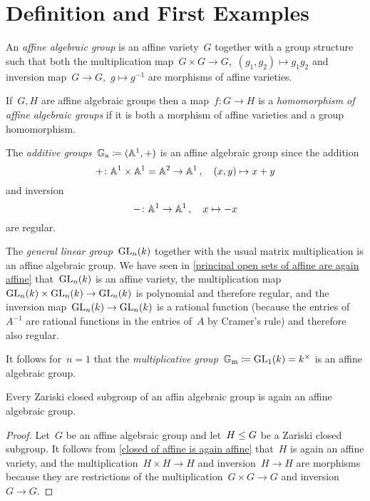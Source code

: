 \section{Definition and First Examples}


\begin{definition}
  An \emph{affine algebraic group} is an affine variety~$G$ together with a group structure such that both the multiplication map~$G \times G \to G$,~$(g_1, g_2) \mapsto g_1 g_2$ and inversion map~$G \to G$,~$g \mapsto g^{-1}$ are morphisms of affine varieties.
  
  If~$G, H$ are affine algebraic groups then a map~$f \colon G \to H$ is a \emph{homomorphism of affine algebraic groups} if it is both a morphism of affine varieties and a group homomorphism.
\end{definition}


\begin{example}
  The \emph{additive groups}~$\mathbb{G}_{\text{a}} \coloneqq (\mathbb{A}^1, +)$ is an affine algebraic group since the addition
  \[
            {+}
    \colon  \mathbb{A}^1 \times \mathbb{A}^1
    =       \mathbb{A}^2
    \to     \mathbb{A}^1 \,,
    \quad   (x,y)
    \mapsto x+y
  \]
  and inversion
  \[
            {-}
    \colon  \mathbb{A}^1
    \to     \mathbb{A}^1 \,,
    \quad   x
    \mapsto -x
  \]
  are regular.
\end{example}


\begin{example}
  The \emph{general linear group}~$\operatorname{GL}_n(k)$ together with the usual matrix multiplication is an affine algebraic group.
  We have seen in \cref{principal open sets of affine are again affine} that~$\operatorname{GL}_n(k)$ is an affine variety, the multiplication map~$\operatorname{GL}_n(k) \times \operatorname{GL}_n(k) \to \operatorname{GL}_n(k)$ is polynomial and therefore regular, and the inversion map~$\operatorname{GL}_n(k) \to \operatorname{GL}_n(k)$ is a rational function (because the entries of~$A^{-1}$ are rational functions in the entries of~$A$ by Cramer’s rule) and therefore also regular.
  
  It follows for~$n = 1$ that the \emph{multiplicative group}~$\mathbb{G}_{\text{m}} \coloneqq \operatorname{GL}_1(k) = k^\times$ is an affine algebraic group.
\end{example}


\begin{lemma}
  Every Zariski closed subgroup of an affin algebraic group is again an affine algebraic group.
\end{lemma}


\begin{proof}
  Let~$G$ be an affine algebraic group and let~$H \leq G$ be a Zariski closed subgroup.
  It follows from \cref{closed of affine is again affine} that~$H$ is again an affine variety, and the multiplication~$H \times H \to H$ and inversion~$H \to H$ are morphisms because they are restrictions of the multiplication~$G \times G \to G$ and inversion~$G \to G$.
\end{proof}


